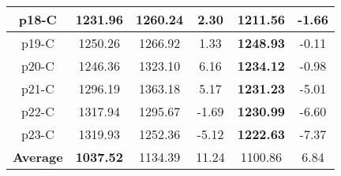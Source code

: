 \begin{table*}[h!]
\begin{minipage}{0.7\columnwidth}
{\begin{tabular}{@{}cccccc@{}}
				\midrule
				p18-C & 1231.96 & 1260.24 & 2.30 & \textbf{1211.56} & -1.66  \\
				\midrule
				p19-C & 1250.26 & 1266.92 & 1.33 & \textbf{1248.93} & -0.11  \\
				\midrule
				p20-C & 1246.36 & 1323.10 & 6.16 & \textbf{1234.12} & -0.98  \\
				\midrule
				p21-C & 1296.19 & 1363.18 & 5.17 & \textbf{1231.23} & -5.01  \\
				\midrule
				p22-C & 1317.94 & 1295.67 & -1.69 & \textbf{1230.99} & -6.60  \\
				\midrule
				p23-C & 1319.93 & 1252.36 & -5.12 & \textbf{1222.63} & -7.37 \\
				\midrule
				\textbf{Average} & \textbf{1037.52} & 1134.39 & 11.24 & 1100.86 & 6.84 \\ \bottomrule
			\end{tabular}%
		}
	\end{minipage}
\end{table*}
